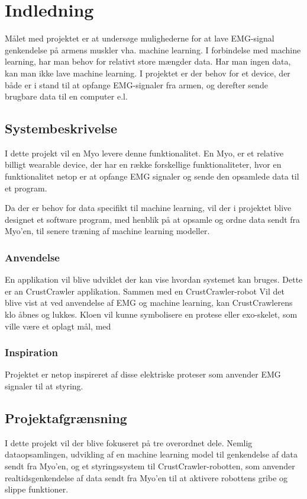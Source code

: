 \thispagestyle{fancy}
\chapter{Indledning}
\label{chp:indledning}

Målet med projektet er at undersøge mulighederne for at lave EMG-signal genkendelse på armens muskler vha. machine learning.
I forbindelse med machine learning, har man behov for relativt store mængder data. Har man ingen data, kan man ikke lave machine learning. I projektet er der behov for et device, der både er i stand til at opfange EMG-signaler fra armen,  og derefter sende brugbare data til en computer e.l.

\section{Systembeskrivelse}
I dette projekt vil en Myo levere denne funktionalitet. En Myo, er et relative billigt wearable device, der har en række forskellige funktionaliteter, hvor en funktionalitet netop er at opfange EMG signaler og sende den opsamlede data til et program. 

Da der er behov for data specifikt til machine learning, vil der i projektet blive designet et software program, med henblik på at opsamle og ordne data sendt fra Myo'en, til senere træning af machine learning modeller.

\subsection{Anvendelse}
En applikation vil blive udviklet der kan vise hvordan systemet kan bruges. Dette er an CrustCrawler applikation. Sammen med en CrustCrawler-robot Vil det blive vist at ved anvendelse af EMG og machine learning, kan CrustCrawlerens klo åbnes og lukkes. Kloen vil kunne symbolisere en protese eller exo-skelet, som ville være et oplagt mål, med 
\subsection{Inspiration}
Projektet er netop inspireret af disse elektriske proteser som anvender EMG signaler til at styring.

\section{Projektafgrænsning}
\label{chp:projektafgensning}
I dette projekt vil der blive fokuseret på tre overordnet dele. Nemlig dataopsamlingen, udvikling af en machine learning model til genkendelse af data sendt fra Myo’en, og et styringssystem til CrustCrawler-robotten, som anvender realtidsgenkendelse af data sendt fra Myo’en til at aktivere robottens gribe og slippe funktioner. 

